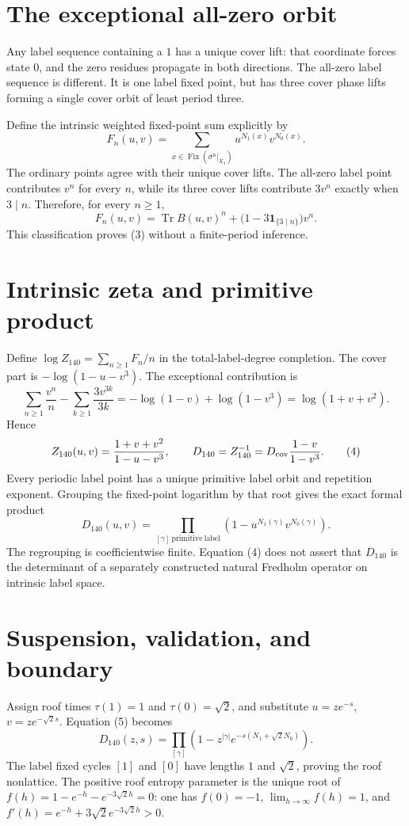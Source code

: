 \documentclass[10pt]{article}
\begin{document}
\section{The exceptional all-zero orbit}
Any label sequence containing a $1$ has a unique cover lift: that coordinate
forces state $0$, and the zero residues propagate in both directions.  The
all-zero label sequence is different.  It is one label fixed point, but has
three cover phase lifts forming a single cover orbit of least period three.

Define the intrinsic weighted fixed-point sum explicitly by
\[
F_n(u,v)=\sum_{x\in\operatorname{Fix}(\sigma^n|_{X_3})}
u^{N_1(x)}v^{N_0(x)}.
\]
The ordinary points agree with their unique cover lifts.
The all-zero label point contributes $v^n$ for every $n$, while its three cover
lifts contribute $3v^n$ exactly when $3\mid n$.  Therefore, for every
$n\geq1$,
\begin{equation}
F_n(u,v)=\operatorname{Tr}B(u,v)^n+
\bigl(1-3\mathbf 1_{\{3\mid n\}}\bigr)v^n.        \tag{3}
\end{equation}
This classification proves (3) without a finite-period inference.

\section{Intrinsic zeta and primitive product}
Define $\log Z_{140}=\sum_{n\geq1}F_n/n$ in the total-label-degree
completion.  The cover part is $-\log(1-u-v^3)$.  The exceptional contribution
is
\[
\sum_{n\geq1}\frac{v^n}{n}-
\sum_{k\geq1}\frac{3v^{3k}}{3k}
=-\log(1-v)+\log(1-v^3)=\log(1+v+v^2).
\]
Hence
\begin{equation}
Z_{140}(u,v)=\frac{1+v+v^2}{1-u-v^3},\qquad
D_{140}=Z_{140}^{-1}=D_{\rm cov}\frac{1-v}{1-v^3}. \tag{4}
\end{equation}
Every periodic label point has a unique primitive label orbit and repetition
exponent.  Grouping the fixed-point logarithm by that root gives the exact
formal product
\begin{equation}
D_{140}(u,v)=\prod_{[\gamma]\ \mathrm{primitive\ label}}
\left(1-u^{N_1(\gamma)}v^{N_0(\gamma)}\right).    \tag{5}
\end{equation}
The regrouping is coefficientwise finite.  Equation (4) does not assert that
$D_{140}$ is the determinant of a separately constructed natural Fredholm
operator on intrinsic label space.

\section{Suspension, validation, and boundary}
Assign roof times $\tau(1)=1$ and $\tau(0)=\sqrt2$, and substitute
$u=ze^{-s}$, $v=ze^{-\sqrt2s}$.  Equation (5) becomes
\[
D_{140}(z,s)=\prod_{[\gamma]}
\left(1-z^{|\gamma|}e^{-s(N_1+\sqrt2N_0)}\right).
\]
The label fixed cycles $[1]$ and $[0]$ have lengths $1$ and $\sqrt2$, proving
the roof nonlattice.  The positive roof entropy parameter is the unique root
of $f(h)=1-e^{-h}-e^{-3\sqrt2h}=0$: one has $f(0)=-1$,
$\lim_{h\to\infty}f(h)=1$, and
$f'(h)=e^{-h}+3\sqrt2e^{-3\sqrt2h}>0$.
\end{document}
